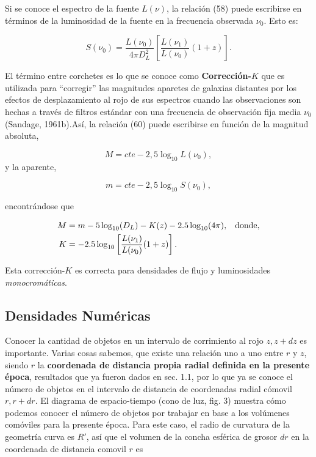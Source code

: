 \documentclass{article}
\begin{document}
    Si se conoce el espectro de la fuente $L(\nu)$, la relación (58) puede escribirse en términos de la luminosidad de la fuente en la frecuencia observada $\nu_0$. Esto es:
    
    \begin{equation}
        S(\nu_0) = \frac{L(\nu_0)}{4\pi D_L^2} \left[ \frac{L(\nu_1)}{L(\nu_0)}(1+z) \right]. 
    \end{equation}
    
    El término entre corchetes es lo que se conoce como {\bf{Corrección-$K$}} que es utilizada para ``corregir'' las magnitudes aparetes de galaxias distantes por los efectos de desplazamiento al rojo de sus espectros cuando las observaciones son hechas a través de filtros estándar con una frecuencia de observación fija media $\nu_0$ (Sandage, 1961b).Así, la relación (60) puede escribirse en función de la magnitud absoluta, 
    
    $$M = cte - 2,5 \log_{10} L(\nu_0),$$ 
    y la aparente, 
    
    $$m = cte - 2,5 \log_{10} S(\nu_0),$$ 
    
    encontrándose que
    
    \begin{align}
        M & = m - 5 \log_{10} (D_L) - K(z) - 2.5 \log_{10} (4\pi), \hspace{0.3cm} \text{donde}, \\
        K & = -2.5 \log_{10} \left[ \frac{L(\nu_1)}{L(\nu_0)}(1+z) \right].
    \end{align}
        
    Esta corrección-$K$ es correcta para densidades de flujo y luminosidades \\ 
    {\textit{monocromáticas}}.
    
\subsection{Densidades Numéricas}

    Conocer la cantidad de objetos en un intervalo de corrimiento al rojo $z, z + dz$ es importante. Varias cosas sabemos, que existe una relación uno a uno entre $r$ y $z$, siendo $r$ la {\bf{coordenada de distancia propia radial definida en la presente época}}, resultados que ya fueron dados en sec. 1.1, por lo que ya se conoce el número de objetos en el intervalo de distancia de coordenadas radial cómovil $r, r+dr$. El diagrama de espacio-tiempo (cono de luz, fig. 3) muestra cómo podemos conocer el número de objetos por trabajar en base a los volúmenes comóviles para la presente época. Para este caso, el radio de curvatura de la geometría curva es $R'$, así que el volumen de la concha esférica de grosor $dr$ en la coordenada de distancia comovil $r$ es
\end{document}
